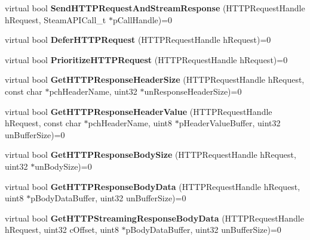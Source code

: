 \begin{DoxyCompactItemize}
\item 
\hypertarget{classISteamHTTP_aaa3eb206430633b3cb2fdd1f628e7e70}{}virtual bool {\bfseries Send\+H\+T\+T\+P\+Request\+And\+Stream\+Response} (H\+T\+T\+P\+Request\+Handle h\+Request, Steam\+A\+P\+I\+Call\+\_\+t $\ast$p\+Call\+Handle)=0\label{classISteamHTTP_aaa3eb206430633b3cb2fdd1f628e7e70}

\item 
\hypertarget{classISteamHTTP_ae4d3d00074fc519f3b7ed31614777c22}{}virtual bool {\bfseries Defer\+H\+T\+T\+P\+Request} (H\+T\+T\+P\+Request\+Handle h\+Request)=0\label{classISteamHTTP_ae4d3d00074fc519f3b7ed31614777c22}

\item 
\hypertarget{classISteamHTTP_ae869069d52aca4f2a40878c8782f2dfd}{}virtual bool {\bfseries Prioritize\+H\+T\+T\+P\+Request} (H\+T\+T\+P\+Request\+Handle h\+Request)=0\label{classISteamHTTP_ae869069d52aca4f2a40878c8782f2dfd}

\item 
\hypertarget{classISteamHTTP_a1c91c0a67456fef68226b8798f5402c0}{}virtual bool {\bfseries Get\+H\+T\+T\+P\+Response\+Header\+Size} (H\+T\+T\+P\+Request\+Handle h\+Request, const char $\ast$pch\+Header\+Name, uint32 $\ast$un\+Response\+Header\+Size)=0\label{classISteamHTTP_a1c91c0a67456fef68226b8798f5402c0}

\item 
\hypertarget{classISteamHTTP_a29c5454400b9633a7b16f4179abf87fc}{}virtual bool {\bfseries Get\+H\+T\+T\+P\+Response\+Header\+Value} (H\+T\+T\+P\+Request\+Handle h\+Request, const char $\ast$pch\+Header\+Name, uint8 $\ast$p\+Header\+Value\+Buffer, uint32 un\+Buffer\+Size)=0\label{classISteamHTTP_a29c5454400b9633a7b16f4179abf87fc}

\item 
\hypertarget{classISteamHTTP_a13e89869bd45e164c0616ddee917473b}{}virtual bool {\bfseries Get\+H\+T\+T\+P\+Response\+Body\+Size} (H\+T\+T\+P\+Request\+Handle h\+Request, uint32 $\ast$un\+Body\+Size)=0\label{classISteamHTTP_a13e89869bd45e164c0616ddee917473b}

\item 
\hypertarget{classISteamHTTP_acb601e559fac3c1551fc3e1f7c0faf4c}{}virtual bool {\bfseries Get\+H\+T\+T\+P\+Response\+Body\+Data} (H\+T\+T\+P\+Request\+Handle h\+Request, uint8 $\ast$p\+Body\+Data\+Buffer, uint32 un\+Buffer\+Size)=0\label{classISteamHTTP_acb601e559fac3c1551fc3e1f7c0faf4c}

\item 
\hypertarget{classISteamHTTP_a01a26e6004a82dc44b606f7f09d9bbb5}{}virtual bool {\bfseries Get\+H\+T\+T\+P\+Streaming\+Response\+Body\+Data} (H\+T\+T\+P\+Request\+Handle h\+Request, uint32 c\+Offset, uint8 $\ast$p\+Body\+Data\+Buffer, uint32 un\+Buffer\+Size)=0\label{classISteamHTTP_a01a26e6004a82dc44b606f7f09d9bbb5}


\end{DoxyCompactItemize}
